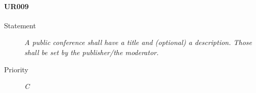 \paragraph{UR009}
  \begin{description}
  \item [Statement] 
    \textit{ A public conference shall have a title and (optional) a description.
			Those shall be set by the publisher/the moderator.}
  \item [Priority] \textit{C}
\end{description}
